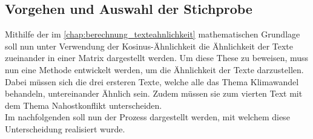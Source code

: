 \subsection{Vorgehen und Auswahl der Stichprobe}
Mithilfe der im \autoref{chap:berechnung_texteahnlichkeit} mathematischen Grundlage soll nun unter Verwendung der Kosinus-Ähnlichkeit die Ähnlichkeit der Texte zueinander in einer Matrix dargestellt werden. Um diese These zu beweisen, muss nun eine Methode entwickelt werden, um die Ähnlichkeit der Texte darzustellen. Dabei müssen sich die drei ersteren Texte, welche alle das Thema Klimawandel behandeln, untereinander Ähnlich sein. Zudem müssen sie zum vierten Text mit dem Thema Nahostkonflikt unterscheiden. \\ \newline
Im nachfolgenden soll nun der Prozess dargestellt werden, mit welchem diese Unterscheidung realisiert wurde.
